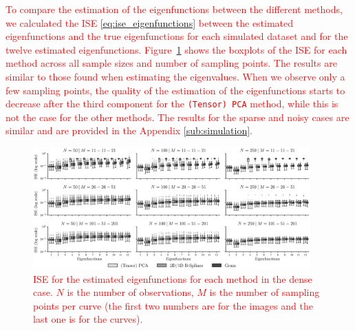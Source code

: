 \begin{results}
\textcolor{red}{To compare the estimation of the eigenfunctions between the different methods, we calculated the ISE \eqref{eq:ise_eigenfunctions} between the estimated eigenfunctions and the true eigenfunctions for each simulated dataset and for the twelve estimated eigenfunctions. Figure~\ref{fig:ise_mfd_1d} shows the boxplots of the ISE for each method across all sample sizes and number of sampling points. The results are similar to those found when estimating the eigenvalues. When we observe only a few sampling points, the quality of the estimation of the eigenfunctions starts to decrease after the third component for the \texttt{(Tensor) PCA} method, while this is not the case for the other methods. The results for the sparse and noisy cases are similar and are provided in the Appendix \ref{sub:simulation}.}
\begin{figure}
     \centering
    \includegraphics[width=0.95\textwidth]{figures/ISE.eps}
    \caption{\textcolor{red}{ISE for the estimated eigenfunctions for each method in the dense case. $N$ is the number of observations, $M$ is the number of sampling points per curve (the first two numbers are for the images and the last one is for the curves).}}
    \label{fig:ise_mfd_1d}
\end{figure}
\end{results}

